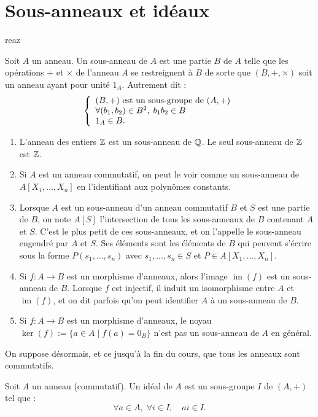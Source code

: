 \documentclass[]{report}
\begin{document}
\section{Sous-anneaux et idéaux}
reaz
\begin{df}{}{}
    Soit $A$ un anneau. Un sous-anneau de $A$ est une partie $B$ de $A$ telle que les opérations $+$ et $\times$ de l'anneau $A$ se restreignent à $B$ de sorte que $(B, +, \times)$ soit un anneau ayant pour unité $1_A$. Autrement dit :
    \[\left\{\begin{array}{ll} (B, +) \text{ est un sous-groupe de } (A, +) \\ \forall (b_1, b_2) \in B^2, \; b_1 b_2 \in B \\ 1_A \in B. \end{array} \right.\]
\end{df}

\begin{ex}{}{}
    \begin{enumerate}
        \item L'anneau des entiers $\mathbb{Z}$ est un sous-anneau de $\mathbb{Q}$. Le seul sous-anneau de $\mathbb{Z}$ est $\mathbb{Z}$.
        \item Si $A$ est un anneau commutatif, on peut le voir comme un sous-anneau de $A[X_1, \ldots, X_n]$ en l'identifiant aux polynômes constants.
        \item Lorsque $A$ est un sous-anneau d'un anneau commutatif $B$ et $S$ est une partie de $B$, on note $A[S]$ l'intersection de tous les sous-anneaux de $B$ contenant $A$ et $S$. C'est le plus petit de ces sous-anneaux, et on l'appelle le sous-anneau engendré par $A$ et $S$. Ses éléments sont les éléments de $B$ qui peuvent s'écrire sous la forme $P(s_1, ..., s_n)$ avec $s_1, ..., s_n \in S$ et $P \in A[X_1, ..., X_n]$.
        \item Si $f : A \to B$ est un morphisme d'anneaux, alors l'image $\operatorname{im}(f)$ est un sous-anneau de $B$. Lorsque $f$ est injectif, il induit un isomorphisme entre $A$ et $\operatorname{im}(f)$, et on dit parfois qu'on peut identifier $A$ à un sous-anneau de $B$.
        \item Si $f : A \to B$ est un morphisme d'anneaux, le noyau $\ker(f) := \{a \in A \mid f(a) = 0_B\}$ n'est pas un sous-anneau de $A$ en général.
    \end{enumerate}
\end{ex}

On suppose désormais, et ce jusqu'à la fin du cours, que tous les anneaux sont commutatifs.

\begin{df}{}{}
    Soit $A$ un anneau (commutatif). Un idéal de $A$ est un sous-groupe $I$ de $(A, +)$ tel que :
    \[\forall a \in A, \; \forall i \in I, \quad ai \in I.\]
\end{df}
\end{document}
